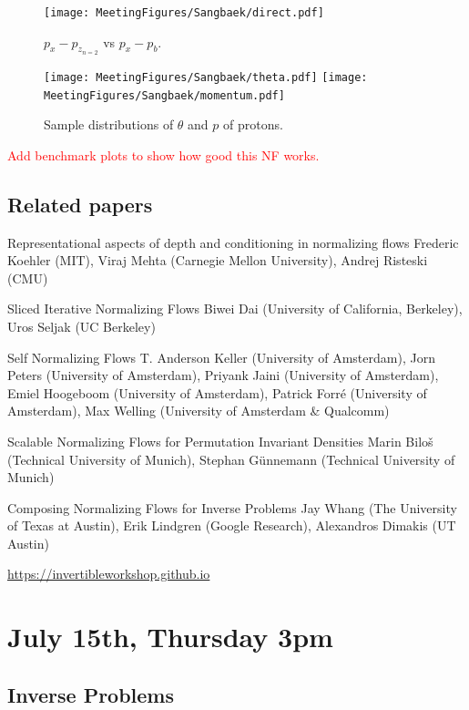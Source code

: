 \begin{figure}[!ht]
\centering
\texttt{[image: MeetingFigures/Sangbaek/direct.pdf]}
\label{fig: jul8_direct}
\caption{$p_x - p_{z_{n=2}}$ vs $p_x - p_{b}$.}
\end{figure}

\begin{figure}[!ht]
\centering
\texttt{[image: MeetingFigures/Sangbaek/theta.pdf]}
\texttt{[image: MeetingFigures/Sangbaek/momentum.pdf]}
\label{fig: jul8_direct}
\caption{Sample distributions of $\theta$ and $p$ of protons.}
\end{figure}

\textcolor{red}{Add benchmark plots to show how good this NF works.}

\subsection{Related papers}

Representational aspects of depth and conditioning in normalizing flows
Frederic Koehler (MIT), Viraj Mehta (Carnegie Mellon University), Andrej Risteski (CMU)

Sliced Iterative Normalizing Flows
Biwei Dai (University of California, Berkeley), Uros Seljak (UC Berkeley)

Self Normalizing Flows
T. Anderson Keller (University of Amsterdam), Jorn Peters (University of Amsterdam), Priyank Jaini (University of Amsterdam), Emiel Hoogeboom (University of Amsterdam), Patrick Forré (University of Amsterdam), Max Welling (University of Amsterdam \& Qualcomm)

Scalable Normalizing Flows for Permutation Invariant Densities
Marin Biloš (Technical University of Munich), Stephan Günnemann (Technical University of Munich)

Composing Normalizing Flows for Inverse Problems
Jay Whang (The University of Texas at Austin), Erik Lindgren (Google Research), Alexandros Dimakis (UT Austin)

\url{https://invertibleworkshop.github.io}

\newpage
\section{July 15th, Thursday 3pm}
\subsection{Inverse Problems}

